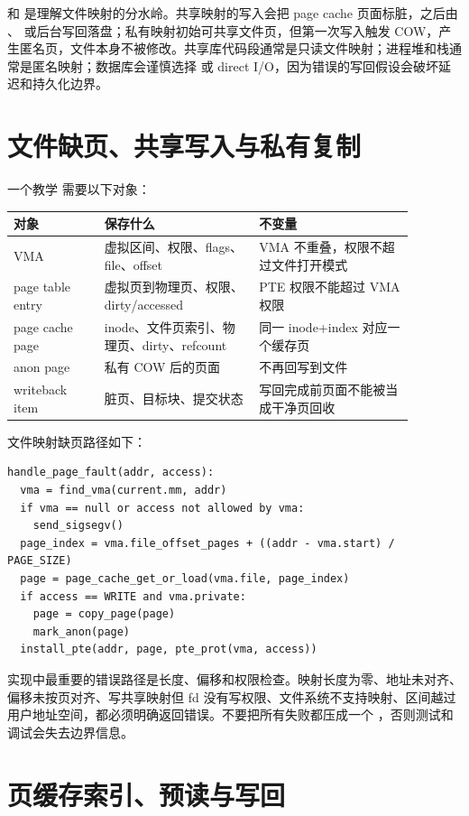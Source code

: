 和  是理解文件映射的分水岭。共享映射的写入会把 page cache 页面标脏，之后由 、 或后台写回落盘；私有映射初始可共享文件页，但第一次写入触发 COW，产生匿名页，文件本身不被修改。共享库代码段通常是只读文件映射；进程堆和栈通常是匿名映射；数据库会谨慎选择  或 direct I/O，因为错误的写回假设会破坏延迟和持久化边界。

\section{文件缺页、共享写入与私有复制}

一个教学  需要以下对象：

\begin{longtable}{p{0.2\linewidth}p{0.34\linewidth}p{0.34\linewidth}}
\toprule
对象 & 保存什么 & 不变量 \\
\midrule
VMA & 虚拟区间、权限、flags、file、offset & VMA 不重叠，权限不超过文件打开模式 \\
page table entry & 虚拟页到物理页、权限、dirty/accessed & PTE 权限不能超过 VMA 权限 \\
page cache page & inode、文件页索引、物理页、dirty、refcount & 同一 inode+index 对应一个缓存页 \\
anon page & 私有 COW 后的页面 & 不再回写到文件 \\
writeback item & 脏页、目标块、提交状态 & 写回完成前页面不能被当成干净页回收 \\
\bottomrule
\end{longtable}

文件映射缺页路径如下：

\begin{lstlisting}
handle_page_fault(addr, access):
  vma = find_vma(current.mm, addr)
  if vma == null or access not allowed by vma:
    send_sigsegv()
  page_index = vma.file_offset_pages + ((addr - vma.start) / PAGE_SIZE)
  page = page_cache_get_or_load(vma.file, page_index)
  if access == WRITE and vma.private:
    page = copy_page(page)
    mark_anon(page)
  install_pte(addr, page, pte_prot(vma, access))
\end{lstlisting}

 实现中最重要的错误路径是长度、偏移和权限检查。映射长度为零、地址未对齐、偏移未按页对齐、写共享映射但 fd 没有写权限、文件系统不支持映射、区间越过用户地址空间，都必须明确返回错误。不要把所有失败都压成一个 ，否则测试和调试会失去边界信息。

\section{页缓存索引、预读与写回}

